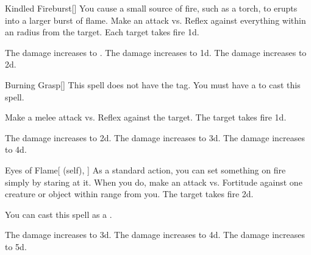 \lowercase{\hypertarget{spell:Kindled Fireburst}{}}\label{spell:Kindled Fireburst}
\begin{freeability}[Rank 1]{\hypertarget{spell:Kindled Fireburst}{Kindled Fireburst}}[]
You cause a small source of fire, such as a torch, to erupts into a larger burst of flame.
Make an attack vs. Reflex against everything within an \areasmall radius from the target.
\hit Each target takes fire  \minus1d.

\rankline
{} The damage increases to .
 The damage increases to  \plus1d.
 The damage increases to  \plus2d.
\end{freeability}
\vspace{0.25em}



\lowercase{\hypertarget{spell:Burning Grasp}{}}\label{spell:Burning Grasp}
\begin{freeability}[Rank 2]{\hypertarget{spell:Burning Grasp}{Burning Grasp}}[]
This spell does not have the  tag.
You must have a  to cast this spell.

Make a melee attack vs. Reflex against the target.
\hit The target takes fire  \plus1d.

\rankline
{} The damage increases to  \plus2d.
 The damage increases to  \plus3d.
 The damage increases to  \plus4d.
\end{freeability}
\vspace{0.25em}



\lowercase{\hypertarget{spell:Eyes of Flame}{}}\label{spell:Eyes of Flame}
\begin{attuneability}[Rank 2]{\hypertarget{spell:Eyes of Flame}{Eyes of Flame}}[ (self), ]
As a standard action, you can set something on fire simply by staring at it.
When you do, make an attack vs. Fortitude against one creature or object within \rngmed range from you.
\hit The target takes fire  \plus2d.

You can cast this spell as a .

\rankline
{} The damage increases to  \plus3d.
 The damage increases to  \plus4d.
 The damage increases to  \plus5d.
\end{attuneability}
\vspace{0.25em}



